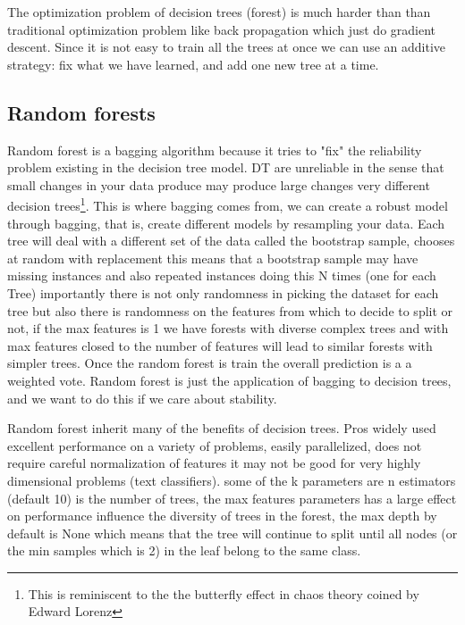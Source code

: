 \documentclass[11pt]{article}
\begin{document}
The optimization problem of decision trees (forest) is much harder than than traditional optimization problem like back propagation which just do gradient descent. Since it is not easy to train all the trees at once we can use an additive strategy: fix what we have learned, and add one new tree at a time. 

\subsection{Random forests}

Random forest is a bagging algorithm because it tries to "fix" the reliability problem existing in the decision tree model. DT are unreliable in the sense that small changes in your data produce may produce large changes very different decision trees\footnote{This is reminiscent to the the butterfly effect in chaos theory coined by Edward Lorenz}. This is where bagging comes from, we can create a robust model through bagging, that is, create different models by resampling your data. Each tree will deal with a different set of the data called the bootstrap sample, chooses at random with replacement this means that a bootstrap sample may have missing instances and also repeated instances doing this N times (one for each Tree) importantly there is not only randomness in picking the dataset for each tree but also there is randomness on the features from which to decide to split or not, if the max features is 1 we have forests with diverse complex trees and with max features closed to the number of features will lead to similar forests with simpler trees. Once the random forest is train the overall prediction is a a weighted vote.
Random forest is just the application of bagging to decision trees, and we want to do this if we care about stability.

Random forest inherit many of the benefits of decision trees. Pros widely used excellent performance on a variety of problems, easily parallelized, does not require careful normalization of features it may not be good for very highly dimensional problems (text classifiers). some of the k parameters are n estimators (default 10) is the number of trees, the max features parameters has a large effect on performance influence the diversity of trees in the forest, the max depth by default is None which means that the tree will continue to split until all nodes (or the min samples which is 2) in the leaf belong to the same class.
\end{document}
